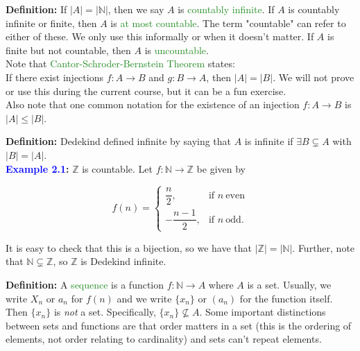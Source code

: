 \documentclass{article}
\begin{document}
\textbf{Definition:} If $|A|=|\mathbb{N}|$, then we say $A$ is \textcolor{ForestGreen}{countably infinite}. If $A$ is countably infinite or finite, then $A$ is \textcolor{ForestGreen}{at most countable}. The term "countable" can refer to either of these. We only use this informally or when it doesn't matter. If $A$ is finite but not countable, then $A$ is \textcolor{ForestGreen}{uncountable}.\\

Note that \textcolor{ForestGreen}{Cantor-Schroder-Bernstein Theorem} states:\\

If there exist injections $f:A \longrightarrow B$ and $g: B \longrightarrow A$, then $|A|=|B|$. We will not prove or use this during the current course, but it can be a fun exercise.\\

Also note that one common notation for the existence of an injection $f:A \longrightarrow B$ is $|A| \leq |B|$.

\textbf{Definition:} Dedekind defined infinite by saying that $A$ is infinite if $\exists B \subsetneq A$ with $|B|=|A|$.\\

\textbf{\textcolor{Blue}{Example 2.1}:} $\mathbb{Z}$ is countable. Let $f: \mathbb{N} \longrightarrow \mathbb{Z}$ be given by 

\begin{center}
    \[
f(n) = 
\begin{cases}
\dfrac{n}{2}, & \text{if } n \ \text{even} \\
-\dfrac{n-1}{2}, & \text{if } n \ \text{odd.}
\end{cases}
\]
\end{center}

It is easy to check that this is a bijection, so we have that $|\mathbb{Z}|=|\mathbb{N}|$. Further, note that $\mathbb{N} \subsetneq \mathbb{Z}$, so $\mathbb{Z}$ is Dedekind infinite.

\textbf{Definition:} A \textcolor{ForestGreen}{sequence} is a function $f: \mathbb{N} \longrightarrow A$ where $A$ is a set. Usually, we write $X_n$ or $a_n$ for $f(n)$ and we write $\{x_n\}$ or $(a_n)$ for the function itself. Then $\{x_n\}$ is \textit{not} a set. Specifically, $\{x_n\} \nsubseteq A$. Some important distinctions between sets and functions are that order matters in a set (this is the ordering of elements, not order relating to cardinality) and sets can't repeat elements. \\
\end{document}
